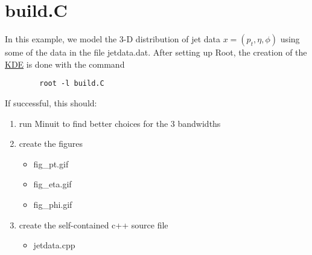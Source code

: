 \hypertarget{build_8C-example}{
\section{build.C}
}
In this example, we model the 3-D distribution of jet data $x = (p_t, \eta, \phi)$ using some of the data in the file jetdata.dat. After setting up Root, the creation of the \hyperlink{classKDE}{KDE} is done with the command 

\footnotesize\begin{verbatim}        root -l build.C
\end{verbatim}
\normalsize
If successful, this should: 

\begin{enumerate}
\item run Minuit to find better choices for the 3 bandwidths\item create the figures\begin{itemize}
\item fig\_\-pt.gif\item fig\_\-eta.gif\item fig\_\-phi.gif\end{itemize}
\item create the self-contained c++ source file\begin{itemize}
\item jetdata.cpp\end{itemize}
\end{enumerate}




